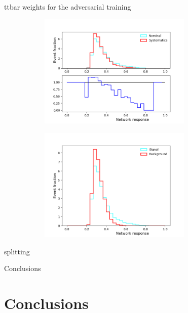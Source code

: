 \documentclass[10pt, UKenglish]{beamer}
\begin{document}
\begin{frame}{ttbar weights for the adversarial training}
\begin{figure}[htbp]
    \centering
    \begin{subfigure}[b]{0.47\textwidth}
        \includegraphics[width=0.8\textwidth]{separation_adversaryweight1.png}
        \label{fig:simple:final:sepa}
    \end{subfigure}
\quad
    \begin{subfigure}[b]{0.47\textwidth}
        \includegraphics[width=0.8\textwidth]{separation_discriminatorweight1.png}
        \label{fig:simple:final:syst}
    \end{subfigure}
    \end{figure}
\end{frame}


\begin{frame}{splitting}
\end{frame}

\begin{frame}{Conclusions}
\end{frame}

\section{Conclusions}
\end{document}
